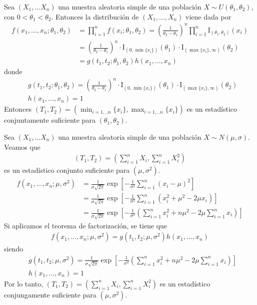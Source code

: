 \begin{ejemplo}
Sea $(X_1,...X_n)$ una muestra aleatoria simple de una población $X \sim U(\theta_1,\theta_2)$, con $0 < \theta_1 < \theta_2$. Entonces la distribución de $(X_1,...,X_n)$ viene dada por
\begin{align*}
    f(x_1,...,x_n;\theta_1,\theta_2) &= \prod_{i=1}^{n}{f(x_i;\theta_1,\theta_2)} = \left( \frac{1}{\theta_2 - \theta_1}\right)^n \prod_{i=1}^{n}{\text{I}_{(\theta_1,\theta_2)}(x_i)} \\
    &= \left( \frac{1}{\theta_2 - \theta_1}\right)^n \cdot \text{I}_{(0,\min\{x_i\})}(\theta_1) \cdot \text{I}_{(\max\{x_i\},\infty)}(\theta_2) \\
    &= g(t_1,t_2;\theta_1,\theta_2) h(x_1,...,x_n)
\end{align*}
donde
\begin{align*}
    &g(t_1,t_2;\theta_1,\theta_2) = \left( \frac{1}{\theta_2 - \theta_1}\right)^n \cdot \text{I}_{(0,\min\{x_i\})}(\theta_1) \cdot \text{I}_{(\max\{x_i\},\infty)}(\theta_2)\\
    &h(x_1,...,x_n) = 1
\end{align*}
Entonces $(T_1,T_2) = (\min_{i=1,..n}\{x_i\}, \max_{i=1,..n}\{x_i\})$ es un estadístico conjuntamente suficiente para $(\theta_1,\theta_2)$.
\end{ejemplo}

\begin{ejemplo}
Sea $(X_1,...X_n)$ una muestra aleatoria simple de una población $X \sim N(\mu,\sigma)$. Veamos que 
\begin{align*}
    (T_1,T_2) = \left( \sum_{i=1}^{n}{X_i}, \sum_{i=1}^{n}{X_i^2}\right)
\end{align*}
es un estadístico conjunto suficiente para $(\mu,\sigma^2)$.
\begin{align*}
    f(x_1,...,x_n;\mu,\sigma^2) &= \frac{1}{\sigma\sqrt{2\pi}}\exp\left[ -\frac{1}{\sigma^2}\sum_{i=1}^{n}{(x_i - \mu)^2}\right] \\
    &= \frac{1}{\sigma\sqrt{2\pi}}\exp\left[ -\frac{1}{\sigma^2}\sum_{i=1}^{n}{(x_i^2 + \mu^2 - 2\mu x_i)}\right] \\
    &= \frac{1}{\sigma\sqrt{2\pi}}\exp\left[ -\frac{1}{\sigma^2}\left(\sum_{i=1}^{n}{x_i^2} + n\mu^2 - 2\mu\sum_{i=1}^{n}{x_i}\right)\right]
\end{align*}
Si aplicamos el teorema de factorización, se tiene que
\begin{align*}
    f(x_1,...,x_n;\mu,\sigma^2) = g(t_1,t_2;\mu,\sigma^2)h(x_1,...,x_n)
\end{align*}
siendo
\begin{align*}
    &g(t_1,t_2;\mu,\sigma^2) = \frac{1}{\sigma\sqrt{2\pi}}\exp\left[ -\frac{1}{\sigma^2}\left(\sum_{i=1}^{n}{x_i^2} + n\mu^2 - 2\mu\sum_{i=1}^{n}{x_i}\right)\right] \\
    &h(x_1,...,x_n) = 1
\end{align*}
Por lo tanto, $(T_1,T_2) = \left( \sum_{i=1}^{n}{X_i}, \sum_{i=1}^{n}{X_i^2}\right)$ es un estadístico conjungamente suficiente para $(\mu,\sigma^2)$.
\end{ejemplo}

